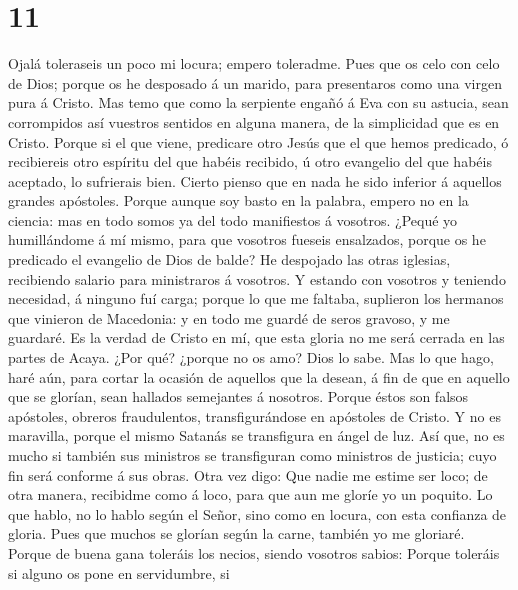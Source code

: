 \hypertarget{section-10}{%
\section{11}\label{section-10}}

 Ojalá toleraseis un poco mi locura; empero toleradme.
 Pues que os celo con celo de Dios; porque os he desposado á
un marido, para presentaros como una virgen pura á Cristo. 
Mas temo que como la serpiente engañó á Eva con su astucia, sean
corrompidos así vuestros sentidos en alguna manera, de la simplicidad
que es en Cristo.  Porque si el que viene, predicare otro
Jesús que el que hemos predicado, ó recibiereis otro espíritu del que
habéis recibido, ú otro evangelio del que habéis aceptado, lo sufrierais
bien.  Cierto pienso que en nada he sido inferior á aquellos
grandes apóstoles.  Porque aunque soy basto en la palabra,
empero no en la ciencia: mas en todo somos ya del todo manifiestos á
vosotros.  ¿Pequé yo humillándome á mí mismo, para que
vosotros fueseis ensalzados, porque os he predicado el evangelio de Dios
de balde?  He despojado las otras iglesias, recibiendo
salario para ministraros á vosotros.  Y estando con vosotros
y teniendo necesidad, á ninguno fuí carga; porque lo que me faltaba,
suplieron los hermanos que vinieron de Macedonia: y en todo me guardé de
seros gravoso, y me guardaré.  Es la verdad de Cristo en
mí, que esta gloria no me será cerrada en las partes de Acaya.
 ¿Por qué? ¿porque no os amo? Dios lo sabe. 
Mas lo que hago, haré aún, para cortar la ocasión de aquellos que la
desean, á fin de que en aquello que se glorían, sean hallados semejantes
á nosotros.  Porque éstos son falsos apóstoles, obreros
fraudulentos, transfigurándose en apóstoles de Cristo.  Y
no es maravilla, porque el mismo Satanás se transfigura en ángel de luz.
 Así que, no es mucho si también sus ministros se
transfiguran como ministros de justicia; cuyo fin será conforme á sus
obras.  Otra vez digo: Que nadie me estime ser loco; de
otra manera, recibidme como á loco, para que aun me gloríe yo un
poquito.  Lo que hablo, no lo hablo según el Señor, sino
como en locura, con esta confianza de gloria.  Pues que
muchos se glorían según la carne, también yo me gloriaré. 
Porque de buena gana toleráis los necios, siendo vosotros sabios:
 Porque toleráis si alguno os pone en servidumbre, si
